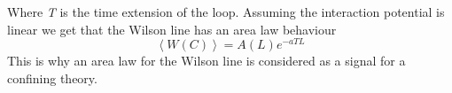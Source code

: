 \documentclass[11pt,a4paper]{article}
\begin{document}

Where \emph{T} is the time extension of the loop. Assuming the interaction potential is linear we get that the Wilson line has an area law behaviour
\begin{equation}
\left\langle W\left(C\right)\right\rangle=A\left(L\right)e^{-aTL}
\end{equation}
This is why an area law for the Wilson line is considered as a signal for a confining theory.
\end{document}
